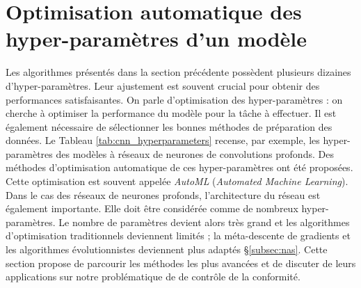 \bigskip

\bigskip


\FloatBarrier
\section{Optimisation automatique des hyper-paramètres d'un modèle} \label{sec:auto_ml}
Les algorithmes présentés dans la section précédente possèdent plusieurs dizaines d'hyper-paramètres.
Leur ajustement est souvent crucial pour obtenir des performances satisfaisantes.
On parle d'optimisation des hyper-paramètres : on cherche à optimiser la performance du modèle pour la tâche à effectuer.
Il est également nécessaire de sélectionner les bonnes méthodes de préparation des données.
Le Tableau \ref{tab:cnn_hyperparameters} recense, par exemple, les hyper-paramètres des modèles à réseaux de neurones de convolutions profonds.
Des méthodes d'optimisation automatique de ces hyper-paramètres ont été proposées.
Cette optimisation est souvent appelée \textit{AutoML} (\textit{Automated Machine Learning}).
Dans le cas des réseaux de neurones profonds, l'architecture du réseau est également importante.
Elle doit être considérée comme de nombreux hyper-paramètres.
Le nombre de paramètres devient alors très grand et les algorithmes d'optimisation traditionnels deviennent limités ; la méta-descente de gradients et les algorithmes évolutionnistes deviennent plus adaptés §\ref{subsec:nas}.
Cette section propose de parcourir les méthodes les plus avancées et de discuter de leurs applications sur notre problématique de de contrôle de la conformité.

